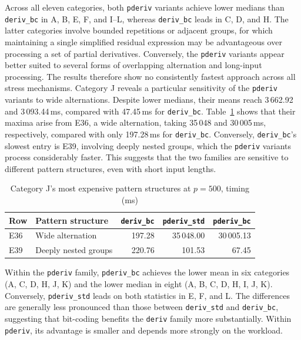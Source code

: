 Across all eleven categories, both \texttt{pderiv}
variants achieve lower medians than
\texttt{deriv\_bc} in A, B, E, F, and I--L,
whereas \texttt{deriv\_bc} leads in C, D, and H.
The latter categories involve bounded repetitions
or adjacent groups, for which maintaining a single
simplified residual expression may be advantageous
over processing a set of partial derivatives.
Conversely, the \texttt{pderiv} variants appear
better suited to several forms of overlapping
alternation and long-input processing.
The results therefore show no consistently
fastest approach across all stress mechanisms.
Category J reveals a particular sensitivity of the
\texttt{pderiv} variants to wide alternations.
Despite lower medians, their means reach
3\,662.92 and 3\,093.44\,ms, compared with
47.45\,ms for \texttt{deriv\_bc}.
Table~\ref{tab:patho-j-offenders} shows that
their maxima arise from E36, a wide alternation,
taking 35\,048 and 30\,005\,ms, respectively,
compared with only 197.28\,ms for \texttt{deriv\_bc}.
Conversely, \texttt{deriv\_bc}'s slowest entry
is E39, involving deeply nested groups,
which the \texttt{pderiv} variants process
considerably faster.
This suggests that the two families are
sensitive to different pattern structures,
even with short input lengths.

\begin{table}[H]
\centering
\small
\setlength{\tabcolsep}{4pt}
\begin{tabular*}{\textwidth}{@{\extracolsep{\fill}} l l rrr}
\hline
Row & Pattern structure &
\texttt{deriv\_bc} &
\texttt{pderiv\_std} &
\texttt{pderiv\_bc} \\
\hline
E36 & Wide alternation
    & 197.28 & 35\,048.00 & 30\,005.13 \\
E39 & Deeply nested groups
    & 220.76 & 101.53 & 67.45 \\
\hline
\end{tabular*}
\caption{Category J's most expensive pattern structures
at $p=500$, timing (ms)}
\label{tab:patho-j-offenders}
\end{table}

Within the \texttt{pderiv} family,
\texttt{pderiv\_bc} achieves the lower mean
in six categories (A, C, D, H, J, K)
and the lower median in eight
(A, B, C, D, H, I, J, K).
Conversely, \texttt{pderiv\_std} leads on
both statistics in E, F, and L.
The differences are generally less pronounced
than those between \texttt{deriv\_std} and
\texttt{deriv\_bc}, suggesting that bit-coding
benefits the \texttt{deriv} family more substantially.
Within \texttt{pderiv}, its advantage is smaller
and depends more strongly on the workload.

